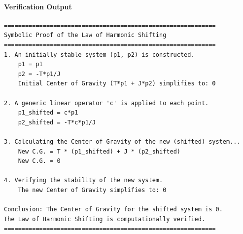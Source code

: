\paragraph{Verification Output}
\begin{verbatim}
============================================================
Symbolic Proof of the Law of Harmonic Shifting
============================================================
1. An initially stable system (p1, p2) is constructed.
    p1 = p1
    p2 = -T*p1/J
    Initial Center of Gravity (T*p1 + J*p2) simplifies to: 0

2. A generic linear operator 'c' is applied to each point.
    p1_shifted = c*p1
    p2_shifted = -T*c*p1/J

3. Calculating the Center of Gravity of the new (shifted) system...
    New C.G. = T * (p1_shifted) + J * (p2_shifted)
    New C.G. = 0

4. Verifying the stability of the new system.
    The new Center of Gravity simplifies to: 0

Conclusion: The Center of Gravity for the shifted system is 0.
The Law of Harmonic Shifting is computationally verified.
============================================================
\end{verbatim}
